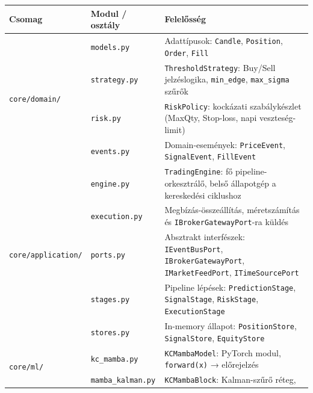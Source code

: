 \begin{table}[H]
  \centering
  \footnotesize
  \renewcommand{\arraystretch}{1.25}
  \begin{tabular}{|l|p{4.2cm}|p{6.3cm}|}
    \hline
    \textbf{Csomag} & \textbf{Modul / osztály} & \textbf{Felelősség} \\
    \hline\hline
    \multirow{4}{*}{\texttt{core/domain/}}
      & \texttt{models.py}      & Adattípusok: \texttt{Candle}, \texttt{Position}, \texttt{Order}, \texttt{Fill} \\
      & \texttt{strategy.py}    & \texttt{ThresholdStrategy}: Buy/Sell jelzéslogika,
                                  \texttt{min\_edge}, \texttt{max\_sigma} szűrők \\
      & \texttt{risk.py}        & \texttt{RiskPolicy}: kockázati szabálykészlet
                                  (MaxQty, Stop-loss, napi veszteség-limit) \\
      & \texttt{events.py}      & Domain-események: \texttt{PriceEvent},
                                  \texttt{SignalEvent}, \texttt{FillEvent} \\
    \hline
    \multirow{5}{*}{\texttt{core/application/}}
      & \texttt{engine.py}      & \texttt{TradingEngine}: fő pipeline-orkesztrálő,
                                  belső állapotgép a kereskedési ciklushoz \\
      & \texttt{execution.py}   & Megbízás-összeállítás, méretszámítás és
                                  \texttt{IBrokerGatewayPort}-ra küldés \\
      & \texttt{ports.py}       & Absztrakt interfészek:
                                  \texttt{IEventBusPort}, \texttt{IBrokerGatewayPort},
                                  \texttt{IMarketFeedPort}, \texttt{ITimeSourcePort} \\
      & \texttt{stages.py}      & Pipeline lépések: \texttt{PredictionStage},
                                  \texttt{SignalStage}, \texttt{RiskStage},
                                  \texttt{ExecutionStage} \\
      & \texttt{stores.py}      & In-memory állapot: \texttt{PositionStore},
                                  \texttt{SignalStore}, \texttt{EquityStore} \\
    \hline
    \multirow{4}{*}{\texttt{core/ml/}}
      & \texttt{kc\_mamba.py}         & \texttt{KCMambaModel}: PyTorch modul,
                                          \texttt{forward(x)} → előrejelzés \\
      & \texttt{mamba\_kalman.py}      & \texttt{KCMambaBlock}: Kalman-szűrő réteg,

\end{tabular}
\end{table}

